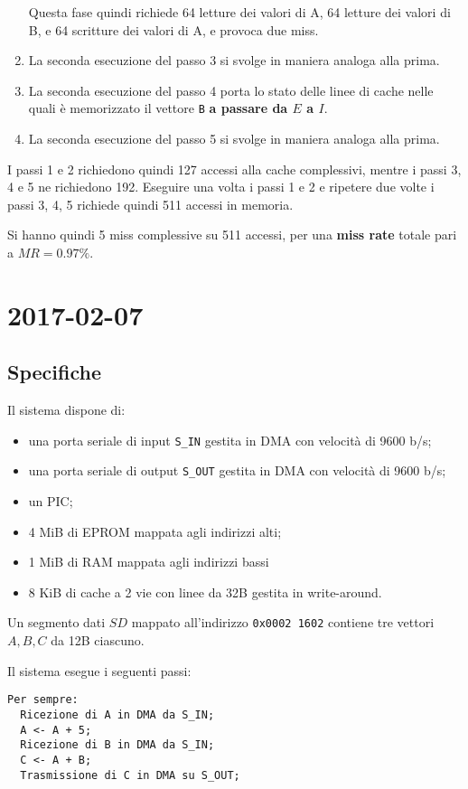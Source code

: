 \documentclass[a4paper]{article}
\begin{document}
\begin{enumerate}
Questa fase quindi richiede 64 letture dei valori di A, 64 letture dei valori di B, e 64 scritture dei valori di A, e provoca due miss.

\item La seconda esecuzione del passo 3 si svolge in maniera analoga alla prima.

\item La seconda esecuzione del passo 4 porta lo stato delle linee di cache nelle quali è memorizzato il vettore \texttt{B} \textbf{a passare da $E$ a $I$}.

\item La seconda esecuzione del passo 5 si svolge in maniera analoga alla prima.
\end{enumerate}


I passi 1 e 2 richiedono quindi 127 accessi alla cache complessivi, mentre i passi 3, 4 e 5 ne richiedono 192. 
Eseguire una volta i passi 1 e 2 e ripetere due volte i passi 3, 4, 5 richiede quindi 511 accessi in memoria. 

Si hanno quindi 5 miss complessive su 511 accessi, per una \textbf{miss rate} totale pari a $MR = 0.97\%$.

\section{2017-02-07}

\subsection{Specifiche}
Il sistema dispone di:

\begin{itemize}
\item una porta seriale di input \texttt{S\_IN} gestita in DMA con velocità di 9600 b/s;
\item una porta seriale di output \texttt{S\_OUT} gestita in DMA con velocità di 9600 b/s;
\item un PIC;
\item 4 MiB di EPROM mappata agli indirizzi alti;
\item 1 MiB di RAM mappata agli indirizzi bassi
\item 8 KiB di cache a 2 vie con linee da 32B gestita in write-around.
\end{itemize}

Un segmento dati $SD$ mappato all'indirizzo \texttt{0x0002 1602} contiene tre vettori $A, B, C$ da 12B ciascuno.

Il sistema esegue i seguenti passi:
\begin{verbatim}
Per sempre:
  Ricezione di A in DMA da S_IN;
  A <- A + 5;
  Ricezione di B in DMA da S_IN;
  C <- A + B;
  Trasmissione di C in DMA su S_OUT;
\end{verbatim}
\end{document}
